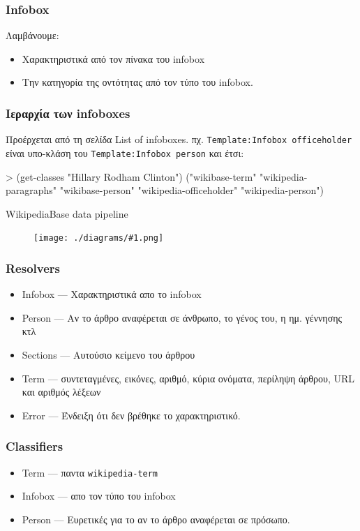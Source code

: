 \documentclass[bigger]{beamer}
\newenvironment{code}{\ttfamily}{\par}
\newcommand{\figframe}[2]{
  \begin{frame}{#2}
    \vfill
    \begin{figure}
      \centering
      \texttt{[image: ./diagrams/\#1.png]}
    \end{figure}
    \vfill
  \end{frame}
}
\begin{document}
\begin{frame}
  \frametitle{Infobox}
  Λαμβάνουμε:
  \begin{itemize}
  \item Χαρακτηριστικά από τον πίνακα του infobox
  \item Την κατηγορία της οντότητας από τον τύπο του infobox.
  \end{itemize}
\end{frame}

\begin{frame}
  \frametitle{Ιεραρχία των infoboxes}

  Προέρχεται από τη σελίδα List of infoboxes.
  πχ. \texttt{Template:Infobox officeholder} είναι υπο-κλάση του
  \texttt{Template:Infobox person} και έτσι:

  \vfill
  \begin{code}
    > (get-classes "Hillary Rodham Clinton")
    ("wikibase-term"
    "wikipedia-paragraphs"
    "wikibase-person"
    "wikipedia-officeholder"
    "wikipedia-person")
  \end{code}
\end{frame}

\figframe{wikipediabase-pipeline}{WikipediaBase data pipeline}

\begin{frame}
  \frametitle{Resolvers}
  \begin{itemize}
  \item Infobox --- Χαρακτηριστικά απο το infobox
  \item Person --- Αν το άρθρο αναφέρεται σε άνθρωπο, το γένος του, η
    ημ. γέννησης κτλ
  \item Sections --- Αυτούσιο κείμενο του άρθρου
  \item Term --- συντεταγμένες, εικόνες, αριθμό, κύρια ονόματα,
    περίληψη άρθρου, URL και αριθμός λέξεων
  \item Error --- Ένδειξη ότι δεν βρέθηκε το χαρακτηριστικό.
  \end{itemize}
\end{frame}

\begin{frame}
  \frametitle{Classifiers}
  \begin{itemize}
  \item Term --- παντα \texttt{wikipedia-term}
  \item Infobox --- απο τον τύπο του infobox
  \item Person --- Ευρετικές για το αν το άρθρο αναφέρεται σε πρόσωπο.
  \end{itemize}
\end{frame}
\end{document}

